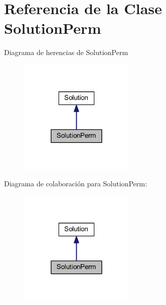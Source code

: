 \hypertarget{class_solution_perm}{\section{Referencia de la Clase Solution\+Perm}
\label{class_solution_perm}
}


Diagrama de herencias de Solution\+Perm
\nopagebreak
\begin{figure}[H]
\begin{center}
\leavevmode
\includegraphics[width=155pt]{class_solution_perm__inherit__graph}
\end{center}
\end{figure}


Diagrama de colaboración para Solution\+Perm\+:
\nopagebreak
\begin{figure}[H]
\begin{center}
\leavevmode
\includegraphics[width=155pt]{class_solution_perm__coll__graph}
\end{center}
\end{figure}
